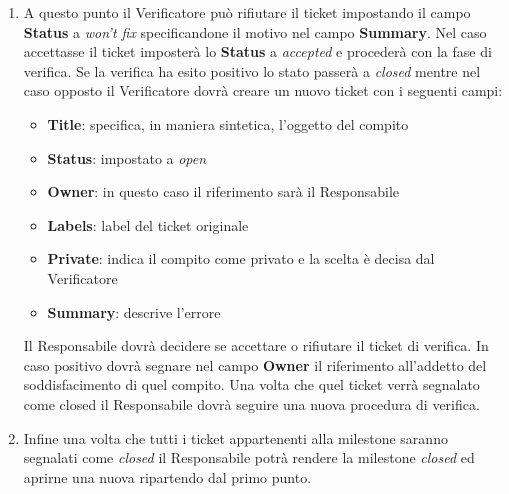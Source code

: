 {{\begin{enumerate}
\begin{itemize}
				\item \textbf{Status}: come in precedenza è da impostare come \emph{open}
				\item \textbf{Owner}: questa volta sarà il riferimento del Verificatore proprietario di questo ticket
				\item \textbf{Labels}: si aggiunge al label del ticket originale il suffisso \textbf{V}
				\item \textbf{Private}: indica il compito come privato e la scelta è lasciata al Responsabile 
				\item \textbf{Summary}: descrizione fatta dal Responsabile
			\end{itemize}
			\item A questo punto il Verificatore può rifiutare il ticket impostando il campo \textbf{Status} a \emph{won't fix} specificandone il motivo nel campo \textbf{Summary}. Nel caso accettasse il ticket imposterà lo \textbf{Status} a \emph{accepted}  e procederà con la fase di verifica.
			Se la verifica ha esito positivo lo stato passerà a \emph{closed} mentre nel caso opposto il Verificatore dovrà creare un nuovo ticket con i seguenti campi:
			
			\begin{itemize}
				\item \textbf{Title}: specifica, in maniera sintetica, l’oggetto del compito
				\item \textbf{Status}: impostato a \emph{open}
				\item \textbf{Owner}: in questo caso il riferimento sarà il Responsabile 
				\item \textbf{Labels}: label del ticket originale
				\item \textbf{Private}: indica il compito come privato e la scelta è decisa dal Verificatore
				\item \textbf{Summary}: descrive l’errore
			\end{itemize}
			Il Responsabile dovrà decidere se accettare o rifiutare il ticket di verifica. In caso positivo dovrà segnare nel campo \textbf{Owner} il riferimento all’addetto del soddisfacimento di quel compito. Una volta che quel ticket verrà segnalato come closed il Responsabile dovrà seguire una nuova procedura di verifica.
			\item Infine una volta che tutti i ticket appartenenti alla milestone saranno segnalati come \emph{closed} il Responsabile potrà rendere la milestone \emph{closed} ed aprirne una nuova ripartendo dal primo punto.
		\end{enumerate}

		
	 }
}